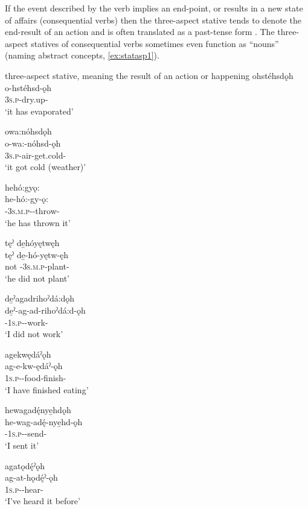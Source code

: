 If the event described by the verb implies an end-point, or results in a new state of affairs (consequential verbs) then the three-aspect stative tends to denote the end-result of an action and is often translated as a past-tense form . The three-aspect statives of consequential verbs sometimes even function as “nouns” (naming abstract concepts, \ref{ex:statasp1}).

\ea\label{ex:stataspectex5} three-aspect stative, meaning the result of an action or happening
\ea ohstéhsdǫh\\
\gll o-hstéhsd-ǫh\\
 \textsc{3s.p}-dry.up-{\stative}\\
\glt `it has evaporated'

\ex owa:nóhsdǫh\\
\gll o-wa:-nóhsd-ǫh\\
 \textsc{3s.p}-air-get.cold-{\stative}\\
\glt `it got cold (weather)'

\ex hehó:gyǫ:\\
\gll he-hó:-gy-ǫ:\\
 {\translocative}-\textsc{3s.m.p}-{\semireflexive}-throw-{\stative}\\
\glt `he has thrown it'

\ex tęˀ de̱hóyętwęh\\
\gll tęˀ de̱-hó-yętw-ęh\\
not {\negative}-\textsc{3s.m.p}-plant-{\stative}\\
\glt `he did not plant'


\ex de̱ˀagadrihoˀdá:dǫh\\
\gll de̱ˀ-ag-ad-rihoˀdá:d-ǫh\\
{\negative}-\textsc{1s.p}-{\semireflexive}-work-{\stative}\\
\glt `I did not work’

\ex agekwędáˀǫh\\
\gll ag-e-kw-ędáˀ-ǫh\\
 \textsc{1s.p}-{\joinerE}-food-finish-{\stative}\\
\glt `I have finished eating'

\ex hewagadę́nye̱hdǫh\\
\gll he-wag-adę́-nye̱hd-ǫh\\
 {\translocative}-\textsc{1s.p}-{\semireflexive}-send-{\stative}\\
\glt `I sent it'

\ex agatǫdę́ˀǫh \\
\gll ag-at-hǫdę́ˀ-ǫh\\
\textsc{1s.p}-{\semireflexive}-hear-{\stative}\\
\glt ‘I’ve heard it before’
\z
\z

